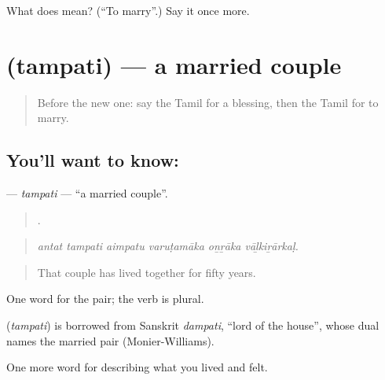 \begin{tcolorbox}[breakable,colback=teal!4,colframe=teal!35!black,title={Before you move on}]
What does  mean? (\textquotedblleft{}To marry\textquotedblright{}.) Say it once more.
\end{tcolorbox}
\section[\texorpdfstring{\ta{தம்பதி} (tampati)}{தம்பதி (tampati)}]{ (tampati) — a married couple}

\label{lesson:TA-C499-tampati}



\begin{quote}
Before the new one: say the Tamil for a blessing, then the Tamil for to marry.
\end{quote}

\subsection*{You'll want to know: }
\textbf{} — \emph{tampati} — \textquotedblleft{}a married couple\textquotedblright{}.

\begin{quote}
     .
\end{quote}

\begin{quote}
\emph{antat tampati aimpatu varuṭamāka oṉṟāka vāḻkiṟārkaḷ.}
\end{quote}

\begin{quote}
That couple has lived together for fifty years.
\end{quote}

One word for the pair; the verb is plural.

\begin{cousinweb}
\textbf{} (\emph{tampati}) is borrowed from Sanskrit \emph{dampati}, \textquotedblleft{}lord of the house\textquotedblright{}, whose dual names the married pair (Monier-Williams).
\end{cousinweb}

\begin{grammarlens}[title={What you've built}]
One more word for describing what you lived and felt.
\end{grammarlens}


